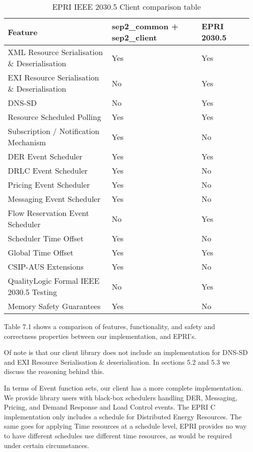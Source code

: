 \begin{table}[h]
	\centering
	\begin{tabular}{llll}
		\toprule
		\textbf{Feature} & \textbf{sep2\_common + sep2\_client} & \textbf{EPRI 2030.5}\\
		\midrule
		XML Resource Serialisation \& Deserialisation & Yes & Yes \\
		EXI Resource Serialisation \& Deserialisation & No  & Yes \\
		DNS-SD                                        & No  & Yes \\
		Resource Scheduled Polling                    & Yes & Yes \\
		Subscription / Notification Mechanism         & Yes & No \\
		DER Event Scheduler                           & Yes & Yes \\
		DRLC Event Scheduler                          & Yes & No \\
		Pricing Event Scheduler                    	  & Yes & No \\
		Messaging Event Scheduler                     & Yes & No \\
		Flow Reservation Event Scheduler              & No  & Yes \\
		Scheduler Time Offset                         & Yes & No \\
		Global Time Offset                            & Yes & Yes \\
		CSIP-AUS Extensions                           & Yes & No \\
		QualityLogic Formal IEEE 2030.5 Testing       & No  & Yes \\
		Memory Safety Guarantees                      & Yes & No \\
		\bottomrule
	\end{tabular}
	\caption{EPRI IEEE 2030.5 Client comparison table}
	\label{tab:comparsiontable}
\end{table}

Table 7.1 shows a comparison of features, functionality, and safety and correctness properties between our implementation, and EPRI's.

Of note is that our client library does not include an implementation for DNS-SD and EXI Resource Serialisation \& deserialisation. In sections 5.2 and 5.3 we discuss the reasoning behind this.  

In terms of Event function sets, our client has a more complete implementation. We provide library users with black-box schedulers handling DER, Messaging, Pricing, and Demand Response and Load Control events. The EPRI C implementation only includes a schedule for Distributed Energy Resources. The same goes for applying Time resources at a schedule level, EPRI provides no way to have different schedules use different time resources, as would be required under certain circumstances.

